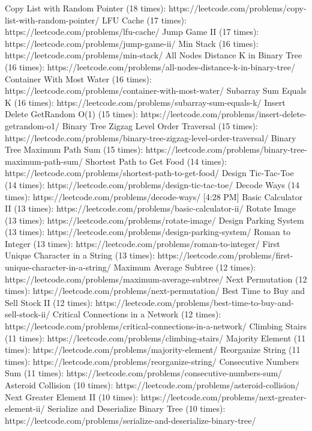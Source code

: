 Copy List with Random Pointer (18 times): https://leetcode.com/problems/copy-list-with-random-pointer/
LFU Cache (17 times): https://leetcode.com/problems/lfu-cache/
Jump Game II (17 times): https://leetcode.com/problems/jump-game-ii/
Min Stack (16 times): https://leetcode.com/problems/min-stack/
All Nodes Distance K in Binary Tree (16 times): https://leetcode.com/problems/all-nodes-distance-k-in-binary-tree/
Container With Most Water (16 times): https://leetcode.com/problems/container-with-most-water/
Subarray Sum Equals K (16 times): https://leetcode.com/problems/subarray-sum-equals-k/
Insert Delete GetRandom O(1) (15 times): https://leetcode.com/problems/insert-delete-getrandom-o1/
Binary Tree Zigzag Level Order Traversal (15 times): https://leetcode.com/problems/binary-tree-zigzag-level-order-traversal/
Binary Tree Maximum Path Sum (15 times): https://leetcode.com/problems/binary-tree-maximum-path-sum/
Shortest Path to Get Food (14 times): https://leetcode.com/problems/shortest-path-to-get-food/
Design Tic-Tac-Toe (14 times): https://leetcode.com/problems/design-tic-tac-toe/
Decode Ways (14 times): https://leetcode.com/problems/decode-ways/
[4:28 PM]
Basic Calculator II (13 times): https://leetcode.com/problems/basic-calculator-ii/
Rotate Image (13 times): https://leetcode.com/problems/rotate-image/
Design Parking System (13 times): https://leetcode.com/problems/design-parking-system/
Roman to Integer (13 times): https://leetcode.com/problems/roman-to-integer/
First Unique Character in a String (13 times): https://leetcode.com/problems/first-unique-character-in-a-string/
Maximum Average Subtree (12 times): https://leetcode.com/problems/maximum-average-subtree/
Next Permutation (12 times): https://leetcode.com/problems/next-permutation/
Best Time to Buy and Sell Stock II (12 times): https://leetcode.com/problems/best-time-to-buy-and-sell-stock-ii/
Critical Connections in a Network (12 times): https://leetcode.com/problems/critical-connections-in-a-network/
Climbing Stairs (11 times): https://leetcode.com/problems/climbing-stairs/
Majority Element (11 times): https://leetcode.com/problems/majority-element/
Reorganize String (11 times): https://leetcode.com/problems/reorganize-string/
Consecutive Numbers Sum (11 times): https://leetcode.com/problems/consecutive-numbers-sum/
Asteroid Collision (10 times): https://leetcode.com/problems/asteroid-collision/
Next Greater Element II (10 times): https://leetcode.com/problems/next-greater-element-ii/
Serialize and Deserialize Binary Tree (10 times): https://leetcode.com/problems/serialize-and-deserialize-binary-tree/
